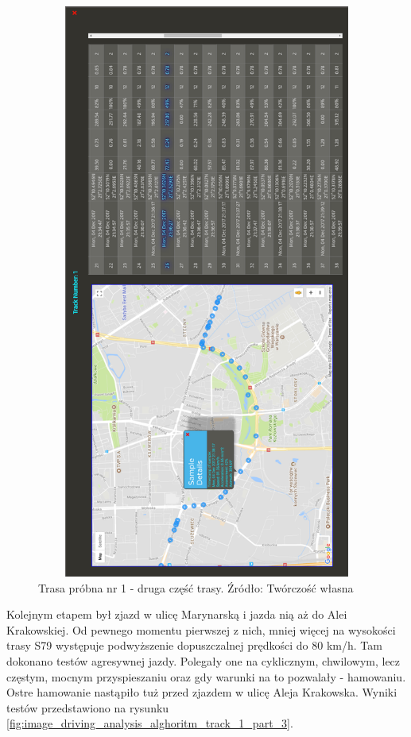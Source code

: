 \begin{figure}[H]
	\centering
	\includegraphics[height=19cm, width=13cm]{img/driving_analysis/test_track_part_2.png}
	\caption{Trasa próbna nr 1 - druga część trasy. Źródło: Twórczość własna}
	\label{fig:image_driving_analysis_alghoritm_track_1_part_2}
\end{figure}

Kolejnym etapem był zjazd w ulicę Marynarską i jazda nią aż do Alei Krakowskiej. Od pewnego momentu pierwszej z nich, mniej więcej na wysokości trasy S79 występuje podwyższenie dopuszczalnej prędkości do 80 km/h. Tam dokonano testów agresywnej jazdy. Polegały one na cyklicznym, chwilowym, lecz częstym, mocnym przyspieszaniu oraz gdy warunki na to pozwalały - hamowaniu. Ostre hamowanie nastąpiło tuż przed zjazdem w ulicę Aleja Krakowska. Wyniki testów przedstawiono na rysunku \ref{fig:image_driving_analysis_alghoritm_track_1_part_3}.


